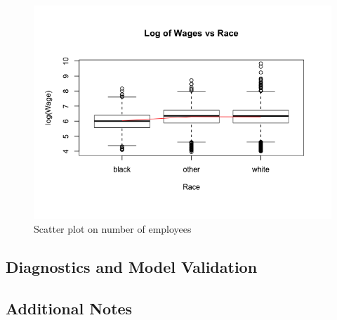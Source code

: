 \documentclass{article}
\begin{document}
\begin{figure}
\begin{minipage}{.45\textwidth}
          \includegraphics[scale=0.35]{boxrace}
          \caption{Scatter plot on number of employees}
          \label{fig:boxrace}
        \end{minipage}
      \end{figure}

    \subsection{Diagnostics and Model Validation}

    \subsection{Additional Notes}
\end{document}
